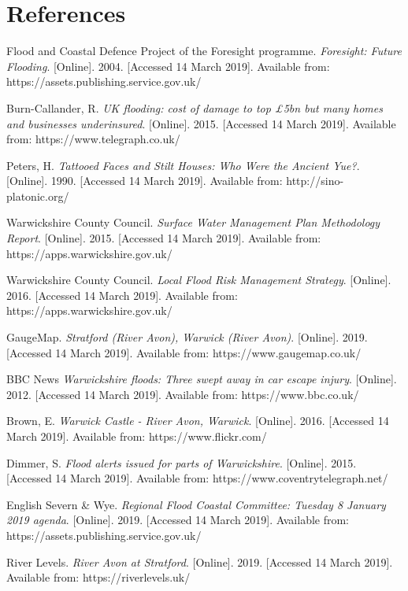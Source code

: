 \documentclass[11pt,a4paper]{article}
\begin{document}
\newpage
\section{References}
\begin{thebibliography}{}
Flood and Coastal Defence Project of the Foresight programme. \textit{Foresight: Future Flooding}. [Online]. 2004. [Accessed 14 March 2019]. Available from: https://assets.publishing.service.gov.uk/

Burn-Callander, R. \textit{UK flooding: cost of damage to top £5bn but many homes and businesses underinsured}. [Online]. 2015. [Accessed 14 March 2019]. Available from: https://www.telegraph.co.uk/

Peters, H. \textit{Tattooed Faces and Stilt Houses: Who Were the Ancient Yue?}. [Online]. 1990. [Accessed 14 March 2019]. Available from: http://sino-platonic.org/

Warwickshire County Council. \textit{Surface Water Management Plan Methodology Report}. [Online]. 2015. [Accessed 14 March 2019]. Available from: https://apps.warwickshire.gov.uk/

Warwickshire County Council. \textit{Local Flood Risk Management Strategy}. [Online]. 2016. [Accessed 14 March 2019]. Available from: https://apps.warwickshire.gov.uk/

\bibitem{}
GaugeMap. \textit{Stratford (River Avon), Warwick (River Avon)}. [Online]. 2019. [Accessed 14 March 2019]. Available from: https://www.gaugemap.co.uk/

\bibitem{}
BBC News \textit{Warwickshire floods: Three swept away in car escape injury}. [Online]. 2012. [Accessed 14 March 2019]. Available from: https://www.bbc.co.uk/

Brown, E. \textit{Warwick Castle - River Avon, Warwick}. [Online]. 2016. [Accessed 14 March 2019]. Available from: https://www.flickr.com/

Dimmer, S. \textit{Flood alerts issued for parts of Warwickshire}. [Online]. 2015. [Accessed 14 March 2019]. Available from: https://www.coventrytelegraph.net/

English Severn \& Wye. \textit{Regional Flood Coastal Committee: Tuesday 8 January 2019 agenda}. [Online]. 2019. [Accessed 14 March 2019]. Available from: https://assets.publishing.service.gov.uk/

River Levels. \textit{River Avon at Stratford}. [Online]. 2019. [Accessed 14 March 2019]. Available from: https://riverlevels.uk/


\end{thebibliography}
\end{document}
